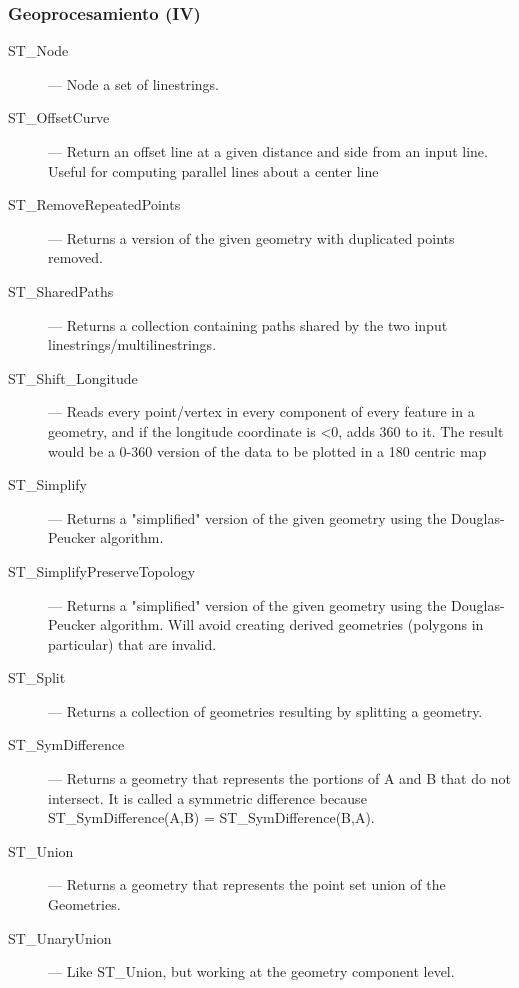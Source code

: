 \documentclass{classes/beamer_GeomaticaUA}
\begin{document}
\begin{frame}[fragile]
\frametitle{Geoprocesamiento (IV)}
\begin{description}
\item[ST\_Node] — Node a set of linestrings.
\item[ST\_OffsetCurve] — Return an offset line at a given distance and side from an input line. Useful for computing parallel lines about a center line
\item[ST\_RemoveRepeatedPoints] — Returns a version of the given geometry with duplicated points removed.
\item[ST\_SharedPaths] — Returns a collection containing paths shared by the two input linestrings/multilinestrings.
\item[ST\_Shift\_Longitude] — Reads every point/vertex in every component of every feature in a geometry, and if the longitude coordinate is <0, adds 360 to it. The result would be a 0-360 version of the data to be plotted in a 180 centric map
\item[ST\_Simplify] — Returns a "simplified" version of the given geometry using the Douglas-Peucker algorithm.
\item[ST\_SimplifyPreserveTopology] — Returns a "simplified" version of the given geometry using the Douglas-Peucker algorithm. Will avoid creating derived geometries (polygons in particular) that are invalid.
\item[ST\_Split] — Returns a collection of geometries resulting by splitting a geometry.
\item[ST\_SymDifference] — Returns a geometry that represents the portions of A and B that do not intersect. It is called a symmetric difference because ST\_SymDifference(A,B) = ST\_SymDifference(B,A).
\item[ST\_Union] — Returns a geometry that represents the point set union of the Geometries.
\item[ST\_UnaryUnion] — Like ST\_Union, but working at the geometry component level.
\end{description}
\end{frame}


\end{document}
